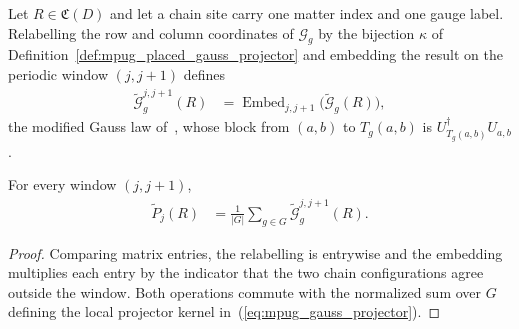 \begin{definition}
    \label{def:mpug_placed_gauss_operator}
    \leanok
    Let $R\in\mathfrak C(D)$ and let a chain site carry one matter index and
    one gauge label. Relabelling the row and column coordinates of
    $\mathcal G_g$ by the bijection $\kappa$ of
    Definition~\ref{def:mpug_placed_gauss_projector} and embedding the result
    on the periodic window $(j,j+1)$ defines
    \begin{align}
        \widetilde{\mathcal G}^{j,j+1}_g(R)
         & =\operatorname{Embed}_{j,j+1}\bigl(\widetilde{\mathcal G}_g(R)\bigr),
        \label{eq:mpug_placed_gauss_operator}
    \end{align}
    the modified Gauss law
    of~\cite[lines~4325--4335]{FrancoRubio2025MPUGauging}, whose block from
    $(a,b)$ to $T_g(a,b)$ is $U_{T_g(a,b)}^\dagger U_{a,b}$.
\end{definition}

\begin{lemma}
    \label{thm:mpug_placed_gauss_projector_average}
    \leanok
    For every window $(j,j+1)$,
    \begin{align}
        \widetilde P_j(R)
         & =\frac{1}{|G|}\sum_{g\in G}\widetilde{\mathcal G}^{j,j+1}_g(R).
        \label{eq:mpug_placed_gauss_projector_average}
    \end{align}
\end{lemma}

\begin{proof}\leanok
    Comparing matrix entries, the relabelling is entrywise and the embedding
    multiplies each entry by the indicator that the two chain configurations
    agree outside the window. Both operations commute with the normalized sum
    over $G$ defining the local projector kernel
    in~(\ref{eq:mpug_gauss_projector}).
\end{proof}

